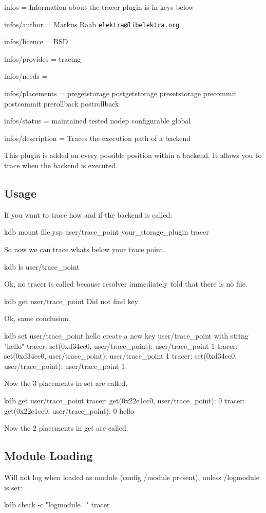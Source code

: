 
\begin{DoxyItemize}
\item infos = Information about the tracer plugin is in keys below
\item infos/author = Markus Raab \href{mailto:elektra@libelektra.org}{\tt elektra@libelektra.\+org}
\item infos/licence = B\+SD
\item infos/provides = tracing
\item infos/needs =
\item infos/placements = pregetstorage postgetstorage presetstorage precommit postcommit prerollback postrollback
\item infos/status = maintained tested nodep configurable global
\item infos/description = Traces the execution path of a backend
\end{DoxyItemize}

This plugin is added on every possible position within a backend. It allows you to trace when the backend is executed.

\subsection*{Usage}

If you want to trace how and if the backend is called\+: \begin{DoxyVerb}kdb mount file.ysp user/trace_point your_storage_plugin tracer
\end{DoxyVerb}


So now we can trace whats below your trace point. \begin{DoxyVerb}kdb ls user/trace_point
\end{DoxyVerb}


Ok, no tracer is called because resolver immediately told that there is no file. \begin{DoxyVerb}kdb get user/trace_point
Did not find key
\end{DoxyVerb}


Ok, same conclusion. \begin{DoxyVerb}kdb set user/trace_point hello
create a new key user/trace_point with string "hello"
tracer: set(0xd34cc0, user/trace_point): user/trace_point 1
tracer: set(0xd34cc0, user/trace_point): user/trace_point 1
tracer: set(0xd34cc0, user/trace_point): user/trace_point 1
\end{DoxyVerb}


Now the 3 placements in set are called. \begin{DoxyVerb}kdb get user/trace_point
tracer: get(0x22e1cc0, user/trace_point): 0
tracer: get(0x22e1cc0, user/trace_point): 0
hello
\end{DoxyVerb}


Now the 2 placements in get are called.

\subsection*{Module Loading}

Will not log when loaded as module (config {\ttfamily /module} present), unless {\ttfamily /logmodule} is set\+: \begin{DoxyVerb}kdb check -c "logmodule=" tracer\end{DoxyVerb}
 